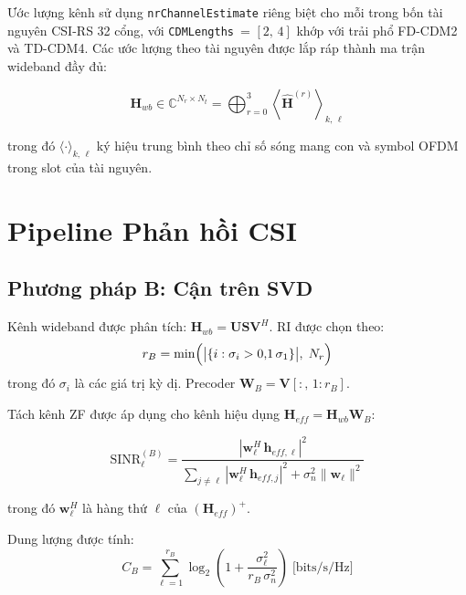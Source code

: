 \documentclass[11pt,a4paper]{article}
\begin{document}
Ước lượng kênh sử dụng \texttt{nrChannelEstimate} riêng biệt cho mỗi trong bốn
tài nguyên CSI-RS 32 cổng, với \texttt{CDMLengths}~= $[2,\,4]$ khớp với trải phổ
FD-CDM2 và TD-CDM4. Các ước lượng theo tài nguyên được lắp ráp thành ma trận
wideband đầy đủ:

\begin{equation}
\mathbf{H}_{wb} \in \mathbb{C}^{N_r \times N_t}
= \bigoplus_{r=0}^{3} \left\langle \hat{\mathbf{H}}^{(r)} \right\rangle_{k,\,\ell}
\end{equation}

trong đó $\langle\cdot\rangle_{k,\,\ell}$ ký hiệu trung bình theo chỉ số sóng
mang con và symbol OFDM trong slot của tài nguyên.

\FloatBarrier
\section{Pipeline Phản hồi CSI}

\subsection{Phương pháp B: Cận trên SVD}

Kênh wideband được phân tích:
$\mathbf{H}_{wb} = \mathbf{U}\mathbf{S}\mathbf{V}^H$.
RI được chọn theo:
\begin{equation}
r_B = \min\Bigl(\bigl|\{i : \sigma_i > 0{,}1\,\sigma_1\}\bigr|,\; N_r\Bigr)
\end{equation}
trong đó $\sigma_i$ là các giá trị kỳ dị. Precoder $\mathbf{W}_B = \mathbf{V}[:,\,1{:}r_B]$.

Tách kênh ZF được áp dụng cho kênh hiệu dụng
$\mathbf{H}_{eff} = \mathbf{H}_{wb}\mathbf{W}_B$:

\begin{equation}
\text{SINR}_\ell^{(B)}
= \frac{|\mathbf{w}_\ell^H\,\mathbf{h}_{eff,\ell}|^2}
       {\sum_{j \neq \ell}|\mathbf{w}_\ell^H\,\mathbf{h}_{eff,j}|^2
        + \sigma_n^2\|\mathbf{w}_\ell\|^2}
\end{equation}

trong đó $\mathbf{w}_\ell^H$ là hàng thứ $\ell$ của $(\mathbf{H}_{eff})^+$.

Dung lượng được tính:
\begin{equation}
C_B = \sum_{\ell=1}^{r_B} \log_2\!\left(1 + \frac{\sigma_\ell^2}{r_B\,\sigma_n^2}\right)
\;\text{[bits/s/Hz]}
\end{equation}
\end{document}
